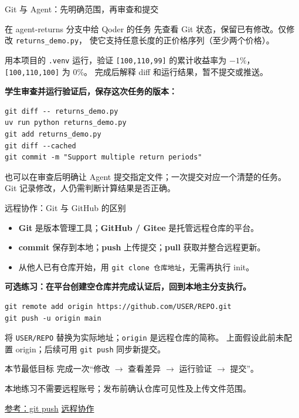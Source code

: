 \documentclass[9pt]{ctexbeamer}
\begin{document}
\begin{frame}[fragile]{Git 与 Agent：先明确范围，再审查和提交}
  \begin{block}{在 agent-returns 分支中给 Qoder 的任务}
    先查看 Git 状态，保留已有修改。仅修改 \texttt{returns\_demo.py}，
    使它支持任意长度的正价格序列（至少两个价格）。\par\medskip
    用本项目的 \texttt{.venv} 运行，验证 \texttt{[100,110,99]} 的累计收益率为
    $-1\%$，\texttt{[100,110,100]} 为 $0\%$。
    完成后解释 diff 和运行结果，暂不提交或推送。
  \end{block}
  \textbf{学生审查并运行验证后，保存这次任务的版本：}
\begin{lstlisting}[language={},numbers=none]
git diff -- returns_demo.py
uv run python returns_demo.py
git add returns_demo.py
git diff --cached
git commit -m "Support multiple return periods"
\end{lstlisting}
  {\small 也可以在审查后明确让 Agent 提交指定文件；一次提交对应一个清楚的任务。
  Git 记录修改，人仍需判断计算结果是否正确。}
\end{frame}

\begin{frame}[fragile]{远程协作：Git 与 GitHub 的区别}
  \begin{itemize}
    \item \textbf{Git} 是版本管理工具；\textbf{GitHub / Gitee} 是托管远程仓库的平台。
    \item \textbf{commit} 保存到本地；\textbf{push} 上传提交；\textbf{pull} 获取并整合远程更新。
    \item 从他人已有仓库开始，用 \texttt{git clone 仓库地址}，无需再执行 init。
  \end{itemize}
  \textbf{可选练习：在平台创建空仓库并完成认证后，回到本地主分支执行。}
\begin{lstlisting}[language={},numbers=none]
git remote add origin https://github.com/USER/REPO.git
git push -u origin main
\end{lstlisting}
  \relax
  {\small 将 \texttt{USER/REPO} 替换为实际地址；\texttt{origin} 是远程仓库的简称。
  上面假设此前未配置 origin；后续可用 \texttt{git push} 同步新提交。}
  \begin{block}{本节最低目标}
    完成一次“修改 $\rightarrow$ 查看差异 $\rightarrow$ 运行验证 $\rightarrow$ 提交”。\par
    本地练习不需要远程账号；发布前确认仓库可见性及上传文件范围。
  \end{block}
  {\tiny\href{https://git-scm.com/docs/git-push}{参考：git push}\quad
  \href{https://git-scm.com/docs/gittutorial}{远程协作}}
\end{frame}
\end{document}
